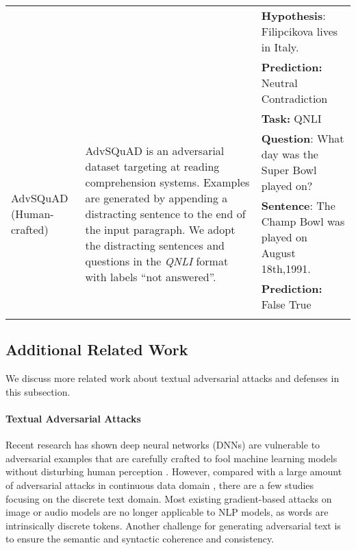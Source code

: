 \documentclass{article}
\begin{document}
\begin{table}[htp!]
{\begin{tabular}{p{2.0cm}p{6cm}p{7cm}}
 & & \textbf{Hypothesis}: Filipcikova lives in Italy. \\
 & & \textbf{Prediction:} Neutral  Contradiction \\
  \midrule
 \multirow{6}{2.0cm}{AdvSQuAD (Human-crafted)} & \multirow{6}{6cm}{AdvSQuAD is an adversarial dataset targeting at reading comprehension systems. Examples are generated by appending a distracting sentence to the end of the input paragraph. We adopt the distracting sentences and questions in the \textit{QNLI} format with labels ``not answered''.} & \textbf{Task:} QNLI \\
 & & \textbf{Question}: What day was the Super Bowl played on?  \\
 & & \textbf{Sentence}: The Champ Bowl was played on August 18th,1991. \\
 & & \textbf{Prediction:} False  True \\
 & & \\
\bottomrule
\end{tabular}
}
\end{table}

\subsection{Additional Related Work}

We discuss more related work about textual adversarial attacks and defenses in this subsection.

\paragraph{Textual Adversarial Attacks}
Recent research has shown deep neural networks (DNNs) are vulnerable to adversarial examples that are carefully crafted to fool machine learning models without disturbing human perception  \citep{Goodfellow2015ExplainingAH,Papernot2016DistillationAA,MoosaviDezfooli2016DeepFoolAS}. However, compared with a large amount of adversarial attacks in continuous data domain \citep{Yang2018CharacterizingAA,Carlini2018AudioAE,Eykholt2017RobustPA}, there are a few studies focusing on the discrete text domain. Most existing gradient-based attacks on image or audio models are no longer applicable to NLP models, as words are intrinsically discrete tokens. Another challenge for generating adversarial text is to ensure the semantic and syntactic coherence and consistency. 
\end{document}
